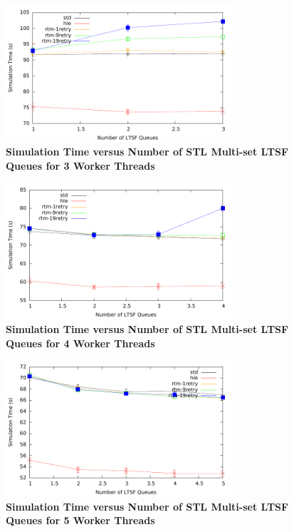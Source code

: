\documentclass[11pt]{book}
\begin{document}
\begin{figure}[H]
    \centering
    \graphicspath{ {./figures/} }
    \includegraphics[width=0.75\textwidth,keepaspectratio]{contThrMig-hugeEpidemicSim-timeVSschedQs-multiset-3thread}
    \caption{\textbf{Simulation Time versus Number of STL Multi-set LTSF Queues
    for 3 Worker Threads}}
    \label{fig:contThrMig_timeVSschq_3threads}
\end{figure}

\begin{figure}[H]
    \centering
    \graphicspath{ {./figures/} }
    \includegraphics[width=0.75\textwidth,keepaspectratio]{contThrMig-hugeEpidemicSim-timeVSschedQs-multiset-4thread}
    \caption{\textbf{Simulation Time versus Number of STL Multi-set LTSF Queues
    for 4 Worker Threads}}
    \label{fig:contThrMig_timeVSschq_4threads}
\end{figure}

\begin{figure}[H]
    \centering
    \graphicspath{ {./figures/} }
    \includegraphics[width=0.75\textwidth,keepaspectratio]{contThrMig-hugeEpidemicSim-timeVSschedQs-multiset-5thread}
    \caption{\textbf{Simulation Time versus Number of STL Multi-set LTSF Queues
    for 5 Worker Threads}}
    \label{fig:contThrMig_timeVSschq_5threads}
\end{figure}
\end{document}
